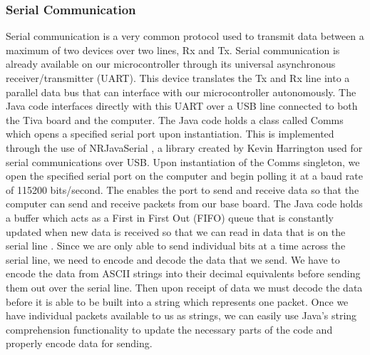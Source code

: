 \subsubsection{Serial Communication}
Serial communication is a very common protocol used to transmit data between a maximum of two devices over two lines, Rx and Tx. Serial communication is already available on our microcontroller through its universal asynchronous receiver/transmitter (UART). This device translates the Tx and Rx line into a parallel data bus that can interface with our microcontroller autonomously. The Java code interfaces directly with this UART over a USB line connected to both the Tiva board and the computer. The Java code holds a class called Comms which opens a specified serial port upon instantiation. This is implemented through the use of NRJavaSerial \cite{NRJavaSerial}, a library created by Kevin Harrington used for serial communications over USB. Upon instantiation of the Comms singleton, we open the specified serial port on the computer and begin polling it at a baud rate of 115200 bits/second. The enables the port to send and receive data so that the computer can send and receive packets from our base board. The Java code holds a buffer which acts as a First in First Out (FIFO) queue that is constantly updated when new data is received so that we can read in data that is on the serial line \cite{SerialSparkfun}.
Since we are only able to send individual bits at a time across the serial line, we need to encode and decode the data that we send.  We have to encode the data from ASCII strings into their decimal equivalents before sending them out over the serial line. Then upon receipt of data we must decode the data before it is able to be built into a string which represents one packet. Once we have individual packets available to us as strings, we can easily use Java's string comprehension functionality to update the necessary parts of the code and properly encode data for sending\cite{SerialSparkfun}.

